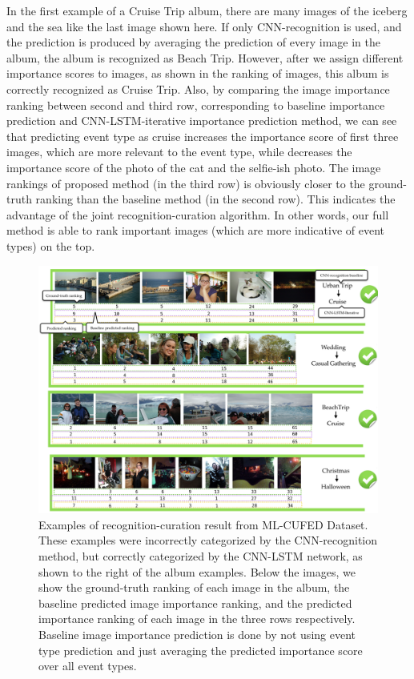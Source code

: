 \documentclass[runningheads]{llncs}
\begin{document}
In the first example of a Cruise Trip album, there are many images of the iceberg and the sea like the last image shown here. If only CNN-recognition is used, and the prediction is produced by averaging the prediction of every image in the album, the album is recognized as Beach Trip. However, after we assign different importance scores to images, as shown in the ranking of images, this album is correctly recognized as Cruise Trip. Also, by comparing the image importance ranking between second and third row, corresponding to baseline importance prediction and CNN-LSTM-iterative importance prediction method, we can see that predicting event type as cruise increases the importance score of first three images, which are more relevant to the event type, while decreases the importance score of the photo of the cat and the selfie-ish photo. The image rankings of proposed method (in the third row) is obviously closer to the ground-truth ranking than the baseline method (in the second row). This indicates the advantage of the joint recognition-curation algorithm. In other words, our full method is able to rank important images (which are more indicative of event types) on the top.
 
\begin{figure}
\vspace{-0.1in}
\centering
\includegraphics[width=5in]{correct1}
\caption{Examples of recognition-curation result from ML-CUFED Dataset. These examples were incorrectly categorized by the CNN-recognition method, but correctly categorized by the CNN-LSTM network, as shown to the right of the album examples. Below the images, we show the ground-truth ranking of each image in the album, the baseline predicted image importance ranking, and the predicted importance ranking of each image in the three rows respectively. Baseline image importance prediction is done by not using event type prediction and just averaging the predicted importance score over all event types.}
\label{correct1}
\vspace{-0.2in}
\end{figure}
\end{document}
